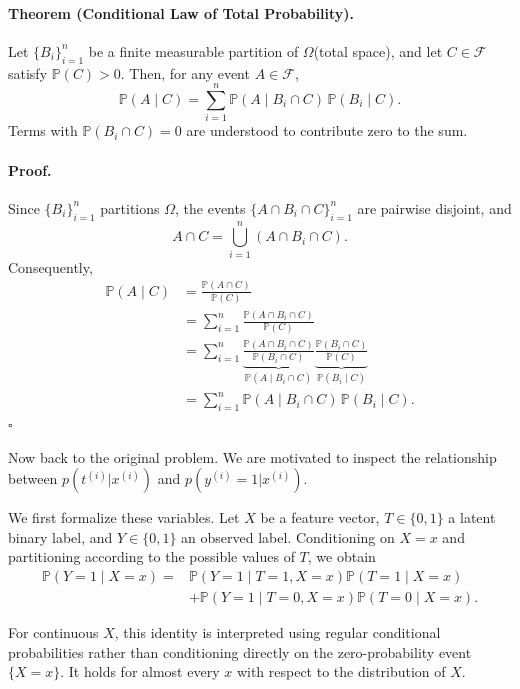 \documentclass[10pt]{article}
\begin{document}
\begin{enumerate}
\begin{enumerate}[label=(\alph*)]
\paragraph{Theorem (Conditional Law of Total Probability).}
Let $\{B_i\}_{i=1}^{n}$ be a finite measurable partition
of $\Omega$(total space), and let $C\in\mathcal F$ satisfy
$\mathbb P(C)>0$. Then, for any event $A\in\mathcal F$,
\[
\boxed{
\mathbb P(A\mid C)
=
\sum_{i=1}^{n}
\mathbb P(A\mid B_i\cap C)\,
\mathbb P(B_i\mid C).
}
\]
Terms with $\mathbb P(B_i\cap C)=0$ are understood to
contribute zero to the sum.

\paragraph{Proof.}
Since $\{B_i\}_{i=1}^{n}$ partitions $\Omega$,
the events $\{A\cap B_i\cap C\}_{i=1}^{n}$
are pairwise disjoint, and
\[
A\cap C
=
\bigcup_{i=1}^{n}(A\cap B_i\cap C).
\]
Consequently,
\[
\begin{aligned}
\mathbb P(A\mid C)
&=\frac{\mathbb P(A\cap C)}{\mathbb P(C)}\\
&=\sum_{i=1}^{n}
\frac{\mathbb P(A\cap B_i\cap C)}{\mathbb P(C)}\\
&=\sum_{i=1}^{n}
\underbrace{
\frac{\mathbb P(A\cap B_i\cap C)}
     {\mathbb P(B_i\cap C)}
}_{\mathbb P(A\mid B_i\cap C)}
\underbrace{
\frac{\mathbb P(B_i\cap C)}
     {\mathbb P(C)}
}_{\mathbb P(B_i\mid C)}\\
&=\sum_{i=1}^{n}
\mathbb P(A\mid B_i\cap C)\,
\mathbb P(B_i\mid C).
\end{aligned}
\]
\hfill $\square$

\vspace{3mm}

Now back to the original problem. We are motivated to inspect the relationship between 
$p(t^{(i)} | x^{(i)})$ and $p(y^{(i)} = 1 | x^{(i)})$.

We first formalize these variables. Let $X$ be a feature vector, $T\in\{0,1\}$ a latent
binary label, and $Y\in\{0,1\}$ an observed label. Conditioning on $X=x$ and partitioning according to
the possible values of $T$, we obtain
\[
\boxed{
\begin{aligned}
\mathbb P(Y=1\mid X=x)
={}&\mathbb P(Y=1\mid T=1,X=x)
    \mathbb P(T=1\mid X=x)\\
&+\mathbb P(Y=1\mid T=0,X=x)
    \mathbb P(T=0\mid X=x).
\end{aligned}
}
\]

For continuous $X$, this identity is interpreted
using regular conditional probabilities rather than
conditioning directly on the zero-probability event
$\{X=x\}$. It holds for almost every $x$ with respect
to the distribution of $X$.


\end{enumerate}
\end{enumerate}
\end{document}

